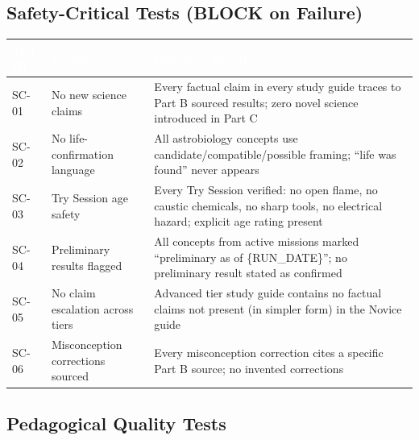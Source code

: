 \documentclass[11pt,letterpaper]{article}
\newcommand{\tableheader}[1]{\textbf{\sffamily\textcolor{white}{#1}}}
\begin{document}
\subsection{Safety-Critical Tests (BLOCK on Failure)}

\begin{center}
\begin{tabularx}{\textwidth}{L{1.5cm}L{3.5cm}X}
\toprule
{}
\tableheader{Test ID} & \tableheader{Verifies} & \tableheader{Expected Result} \\
\midrule
SC-01 & No new science claims & Every factual claim in every study guide traces to Part B sourced results; zero novel science introduced in Part C \\
SC-02 & No life-confirmation language & All astrobiology concepts use candidate/compatible/possible framing; ``life was found'' never appears \\
SC-03 & Try Session age safety & Every Try Session verified: no open flame, no caustic chemicals, no sharp tools, no electrical hazard; explicit age rating present \\
SC-04 & Preliminary results flagged & All concepts from active missions marked ``preliminary as of \{RUN\_DATE\}''; no preliminary result stated as confirmed \\
SC-05 & No claim escalation across tiers & Advanced tier study guide contains no factual claims not present (in simpler form) in the Novice guide \\
SC-06 & Misconception corrections sourced & Every misconception correction cites a specific Part B source; no invented corrections \\
\bottomrule
\end{tabularx}
\end{center}

\subsection{Pedagogical Quality Tests}
\end{document}
